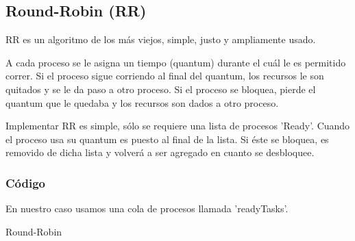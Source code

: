 \subsection{Round-Robin (RR)}
RR es un algoritmo de los más viejos, simple, justo y ampliamente usado.

A cada proceso se le asigna un tiempo (quantum) durante el cuál le es permitido correr.
Si el proceso sigue corriendo al final del quantum, los recursos le son quitados y se le da paso a otro proceso.
Si el proceso se bloquea, pierde el quantum que le quedaba y los recursos son dados a otro proceso.

Implementar RR es simple, sólo se requiere una lista de procesos 'Ready'.
Cuando el proceso usa su quantum es puesto al final de la lista. 
Si éste se bloquea, es removido de dicha lista y volverá a ser agregado en cuanto se desbloquee.

\subsubsection{Código}

En nuestro caso usamos una cola de procesos llamada 'readyTasks'.

\begin{algorithm}
 \caption{Round-Robin}
 \begin{algorithmic}[1] 
 \EndProcedure


 \EndProcedure


   \Else
	 \EndIf	    
      \EndIf
   \EndIf
 \EndProcedure

 
    \Else
    \EndIf
 \EndProcedure
 \end{algorithmic}
\end{algorithm}

